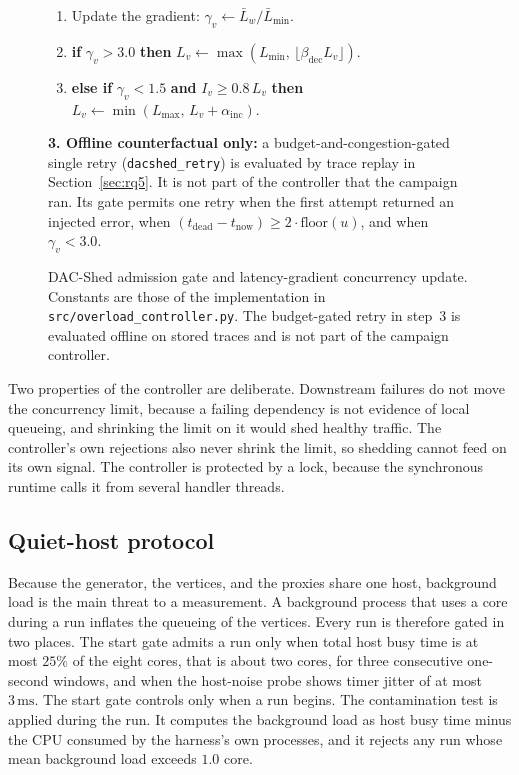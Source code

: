 \begin{figure}[!t]
{\begin{minipage}{0.95\columnwidth}
\begin{enumerate}
    \item Update the gradient: $\gamma_v \leftarrow \bar{L}_w / \bar{L}_{\min}$.
    \item \textbf{if} $\gamma_v > 3.0$ \textbf{then} $L_v \leftarrow \max(L_{\min},\, \lfloor \beta_{\text{dec}} L_v \rfloor)$.
    \item \textbf{else if} $\gamma_v < 1.5$ \textbf{and} $I_v \ge 0.8\,L_v$ \textbf{then} $L_v \leftarrow \min(L_{\max},\, L_v + \alpha_{\text{inc}})$.
\end{enumerate}
\textbf{3. Offline counterfactual only:} a budget-and-congestion-gated single retry (\texttt{dacshed\_retry}) is evaluated by trace replay in Section~\ref{sec:rq5}. It is not part of the controller that the campaign ran. Its gate permits one retry when the first attempt returned an injected error, when $(t_{\text{dead}} - t_{\text{now}}) \ge 2\cdot\text{floor}(u)$, and when $\gamma_v < 3.0$.
\end{minipage}%
}
\caption{DAC-Shed admission gate and latency-gradient concurrency update. Constants are those of the implementation in \texttt{src/overload\_controller.py}. The budget-gated retry in step~3 is evaluated offline on stored traces and is not part of the campaign controller.}
\label{alg:dacshed}
\end{figure}

Two properties of the controller are deliberate. Downstream failures do not move the concurrency limit, because a failing dependency is not evidence of local queueing, and shrinking the limit on it would shed healthy traffic. The controller's own rejections also never shrink the limit, so shedding cannot feed on its own signal. The controller is protected by a lock, because the synchronous runtime calls it from several handler threads.

\subsection{Quiet-host protocol}
\label{sec:protocol}

Because the generator, the vertices, and the proxies share one host, background load is the main threat to a measurement. A background process that uses a core during a run inflates the queueing of the vertices. Every run is therefore gated in two places. The start gate admits a run only when total host busy time is at most $25\%$ of the eight cores, that is about two cores, for three consecutive one-second windows, and when the host-noise probe shows timer jitter of at most $3\,\mathrm{ms}$. The start gate controls only when a run begins. The contamination test is applied during the run. It computes the background load as host busy time minus the CPU consumed by the harness's own processes, and it rejects any run whose mean background load exceeds $1.0$ core.


